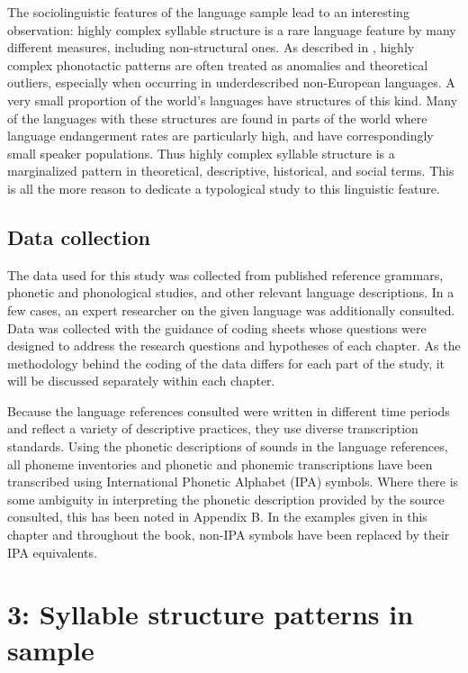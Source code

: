   The sociolinguistic features of the language sample lead to an interesting observation: highly complex syllable structure is a rare language feature by many different measures, including non-structural ones. As described in , highly complex phonotactic patterns are often treated as anomalies and theoretical outliers, especially when occurring in underdescribed non-European languages. A very small proportion of the world’s languages have structures of this kind. Many of the languages with these structures are found in parts of the world where language endangerment rates are particularly high, and have correspondingly small speaker populations. Thus highly complex syllable structure is a  marginalized pattern in theoretical, descriptive, historical, and social terms. This is all the more reason to dedicate a typological study to this linguistic feature.

\section{Data collection}\label{sec:2.5}

  The data used for this study was collected from published reference grammars, phonetic and phonological studies, and other relevant language descriptions. In a few cases, an expert researcher on the given language was additionally consulted. Data was collected with the guidance of coding sheets whose questions were designed to address the research questions and hypotheses of each chapter. As the methodology behind the coding of the data differs for each part of the study, it will be discussed separately within each chapter.

  Because the language references consulted were written in different time periods and reflect a variety of descriptive practices, they use diverse transcription standards. Using the phonetic descriptions of sounds in the language references, all phoneme inventories and phonetic and phonemic transcriptions have been transcribed using International Phonetic Alphabet (IPA) symbols. Where there is some ambiguity in interpreting the phonetic description provided by the source consulted, this has been noted in Appendix B. In the examples given in this chapter and throughout the book, non-IPA symbols have been replaced by their IPA equivalents.

\chapter{3: Syllable structure patterns in sample}


